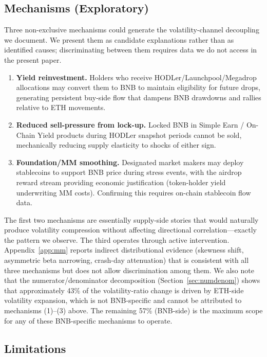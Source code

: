 \documentclass[11pt,a4paper]{article}
\begin{document}
\subsection{Mechanisms (Exploratory)}

Three non-exclusive mechanisms could generate the volatility-channel decoupling we document. We present them as candidate explanations rather than as identified causes; discriminating between them requires data we do not access in the present paper.

\begin{enumerate}
\item \textbf{Yield reinvestment.} Holders who receive HODLer/Launchpool/Megadrop allocations may convert them to BNB to maintain eligibility for future drops, generating persistent buy-side flow that dampens BNB drawdowns and rallies relative to ETH movements.
\item \textbf{Reduced sell-pressure from lock-up.} Locked BNB in Simple Earn / On-Chain Yield products during HODLer snapshot periods cannot be sold, mechanically reducing supply elasticity to shocks of either sign.
\item \textbf{Foundation/MM smoothing.} Designated market makers may deploy stablecoins to support BNB price during stress events, with the airdrop reward stream providing economic justification (token-holder yield underwriting MM costs). Confirming this requires on-chain stablecoin flow data.
\end{enumerate}

The first two mechanisms are essentially supply-side stories that would naturally produce volatility compression without affecting directional correlation---exactly the pattern we observe. The third operates through active intervention. Appendix~\ref{app:mm} reports indirect distributional evidence (skewness shift, asymmetric beta narrowing, crash-day attenuation) that is consistent with all three mechanisms but does not allow discrimination among them. We also note that the numerator/denominator decomposition (Section~\ref{sec:numdenom}) shows that approximately 43\% of the volatility-ratio change is driven by ETH-side volatility expansion, which is not BNB-specific and cannot be attributed to mechanisms (1)--(3) above. The remaining 57\% (BNB-side) is the maximum scope for any of these BNB-specific mechanisms to operate.

\subsection{Limitations}
\end{document}
